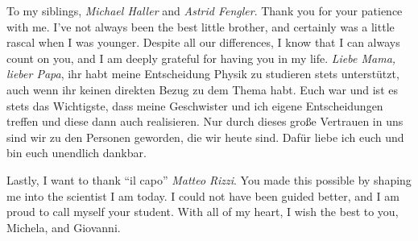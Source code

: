 To my siblings, {\it Michael Haller} and {\it Astrid Fengler}.
Thank you for your patience with me.
I've not always been the best little brother, and certainly was a little rascal when I was younger.
Despite all our differences, I know that I can always count on you, and I am deeply grateful for having you in my life.
{\it Liebe Mama, lieber Papa}, ihr habt meine Entscheidung Physik zu studieren stets unterstützt, auch wenn ihr keinen direkten Bezug zu dem Thema habt.
Euch war und ist es stets das Wichtigste, dass meine Geschwister und ich eigene Entscheidungen treffen und diese dann auch realisieren.
Nur durch dieses große Vertrauen in uns sind wir zu den Personen geworden, die wir heute sind.
Dafür liebe ich euch und bin euch unendlich dankbar.

Lastly, I want to thank ``il capo'' {\it Matteo Rizzi}.
You made this possible by shaping me into the scientist I am today.
I could not have been guided better, and I am proud to call myself your student.
With all of my heart, I wish the best to you, Michela, and Giovanni.

